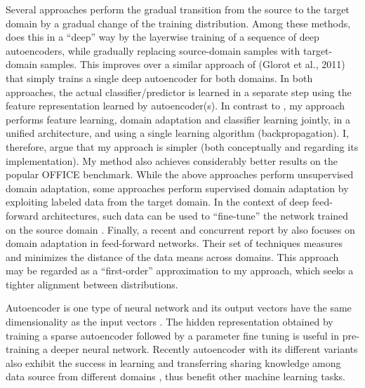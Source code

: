 \documentclass{iitthesis}
\begin{document}
Several approaches perform the gradual transition from the source to the target domain \cite{gopalan2011domain} \cite{gong2012geodesic} by a gradual change of the training distribution. Among these methods, \cite{chopra2013dlid} does this in a “deep” way by the layerwise training of a sequence of deep autoencoders, while gradually replacing source-domain samples with target-domain samples. This improves over a similar approach of (Glorot et al., 2011) that simply trains a single deep autoencoder for both domains. In both approaches, the actual classifier/predictor is learned in a separate step using the feature representation learned by autoencoder(s). In contrast to \cite{glorot2011domain} \cite{chopra2013dlid}\cite{wang2009face}, my approach performs
feature learning, domain adaptation and classifier learning jointly, in a unified architecture, and using a single learning algorithm (backpropagation). I, therefore, argue that my approach is simpler (both conceptually and regarding its implementation). My method also achieves considerably better results on the popular OFFICE benchmark. While the above approaches perform unsupervised domain adaptation, some approaches perform supervised domain adaptation by exploiting labeled data from the target domain. In the context of deep feed-forward architectures, such data can be used to “fine-tune” the network trained on the source domain \cite{zeiler2014visualizing} \cite{oquab2014learning} \cite{babenko2014neural}. Finally, a recent and concurrent report by \cite{tzeng2014deep} also focuses on domain adaptation in feed-forward networks. Their set of techniques measures and minimizes the distance of the data means across domains. This approach may be regarded as a “first-order” approximation to my approach, which seeks a tighter alignment between distributions.

Autoencoder is one type of neural network and its output vectors have the same dimensionality as the input vectors \cite{vincent2008ICML}. The hidden representation obtained by training a sparse autoencoder followed by a parameter fine tuning is useful in pre-training a deeper neural network. Recently autoencoder with its different variants \cite{MarginalizedDenoisingAutoencoders2012ICML,Glorot11domainadaptation} also exhibit the success in learning and transferring sharing knowledge among data source from different domains \cite{BP:12,BY:12,DJ:13},
thus benefit other machine learning tasks. 
\end{document}
